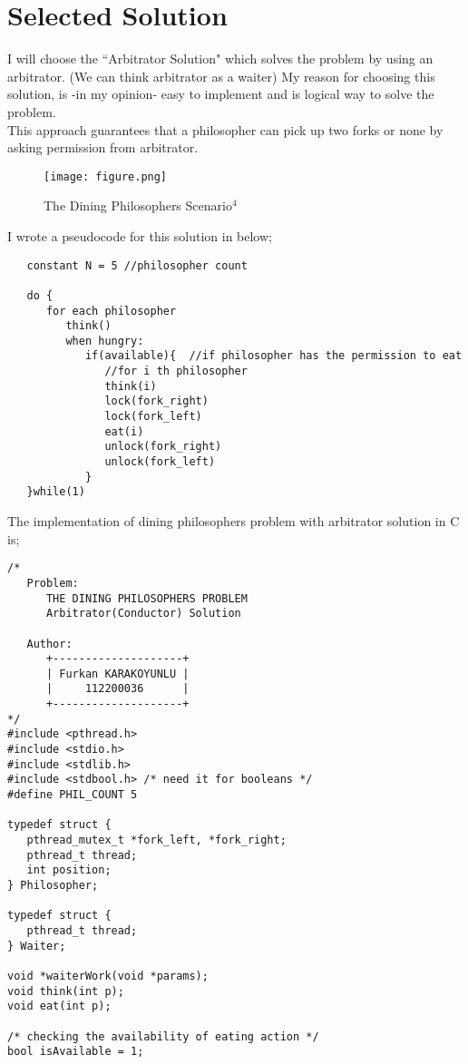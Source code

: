\documentclass[12pt,a4paper]{report}
\begin{document}
 \section*{Selected Solution}
 \begin{flushleft}
  I will choose the ``Arbitrator Solution" which solves the problem by using an arbitrator. (We can think arbitrator as a waiter) My reason for choosing this solution, 
  is -in my opinion- easy to implement and is logical way to solve the problem.\\
  \bigskip
  This approach guarantees that a philosopher can pick up two forks or none by asking permission from arbitrator.\\
  \begin{figure}[h]
   \centering
   \texttt{[image: figure.png]}
   \caption{The Dining Philosophers Scenario$^4$}
  \end{figure}
  \bigskip
  I wrote a pseudocode for this solution in below;\\
  \begin{verbatim}
   constant N = 5 //philosopher count

   do {
      for each philosopher
         think()
         when hungry:
            if(available){  //if philosopher has the permission to eat
               //for i th philosopher
               think(i)
               lock(fork_right)
               lock(fork_left)
               eat(i)
               unlock(fork_right)
               unlock(fork_left)
            }
   }while(1)
  \end{verbatim}
  \pagebreak
  The implementation of dining philosophers problem with arbitrator solution in C is;\\
  \begin{verbatim}
/*
   Problem:
      THE DINING PHILOSOPHERS PROBLEM
      Arbitrator(Conductor) Solution
      
   Author:
      +--------------------+
      | Furkan KARAKOYUNLU |
      |     112200036      |
      +--------------------+
*/
#include <pthread.h>
#include <stdio.h>
#include <stdlib.h>
#include <stdbool.h> /* need it for booleans */
#define PHIL_COUNT 5

typedef struct {
   pthread_mutex_t *fork_left, *fork_right;
   pthread_t thread;
   int position;
} Philosopher;

typedef struct {
   pthread_t thread;
} Waiter;

void *waiterWork(void *params);
void think(int p);
void eat(int p);

/* checking the availability of eating action */
bool isAvailable = 1;


\end{verbatim}
\end{flushleft}
\end{document}
